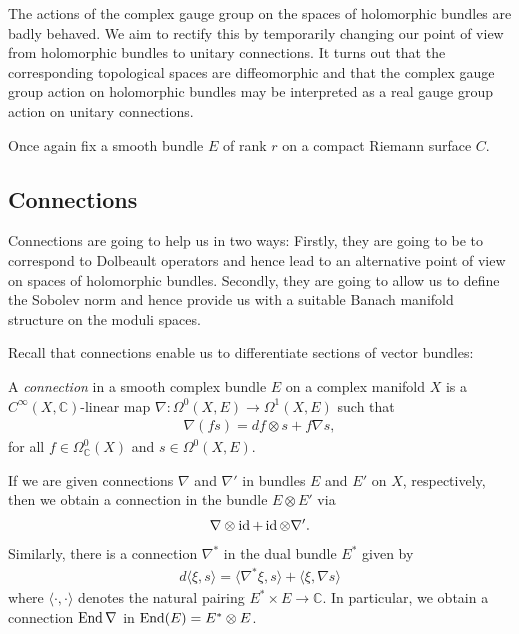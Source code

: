 \documentclass[12pt]{ociamthesis}  %
\begin{document}
The actions of the complex gauge group on the spaces of holomorphic
bundles are badly behaved. We aim to rectify this by temporarily
changing our point of view from holomorphic bundles to unitary
connections. It turns out that the corresponding topological spaces
are diffeomorphic and that the complex gauge group action on holomorphic bundles
may be interpreted as a real gauge group action on unitary connections.

Once again fix a smooth bundle $E$ of rank $r$ on a compact
Riemann surface $C$.

\subsection{Connections}

Connections are going to help us in two ways: Firstly, they are going to
be to correspond to Dolbeault operators and hence lead to an
alternative point of view on spaces of holomorphic bundles.
Secondly, they are going to allow us to define the Sobolev norm and
hence provide us with a suitable Banach manifold structure on
the moduli spaces.

Recall that connections enable us to differentiate sections of
vector bundles:

\begin{definition}
  A \emph{connection} in a smooth complex bundle $E$ on
  a complex manifold $X$ is a $C^\infty(X,\mathbb C)$-linear
  map $\nabla : \Omega^0(X,E) \to \Omega^1(X,E)$
  such that
  \begin{align*}
    \nabla (fs) = df \otimes s + f\nabla s,
  \end{align*}
  for all $f\in \Omega^0_{\mathbb C}(X)$ and $s\in\Omega^0(X,E)$.
\end{definition}

\begin{example}\label{ex:connection_on_end}
  If we are given connections $\nabla$ and $\nabla'$ in bundles $E$ and $E'$ on $X$,
  respectively, then we obtain a connection in the bundle $E\otimes E'$ via
  \begin{align*}
    \nabla \otimes \operatorname{id} + \operatorname{id} \otimes \nabla'.
  \end{align*}
  Similarly, there is a connection $\nabla^*$ in the dual bundle $E^*$ given by
  \begin{align*}
    d\langle \xi,s\rangle
    = \langle \nabla^*\xi, s \rangle + \langle \xi,\nabla s\rangle
  \end{align*}
  where $\langle\cdot,\cdot\rangle$ denotes the natural pairing $E^*\times E\to\mathbb{C}$.
  In particular, we obtain a connection $\operatorname{End}\nabla$ in $\operatorname{End}(E) = E^* \otimes E$.
\end{example}
\end{document}
